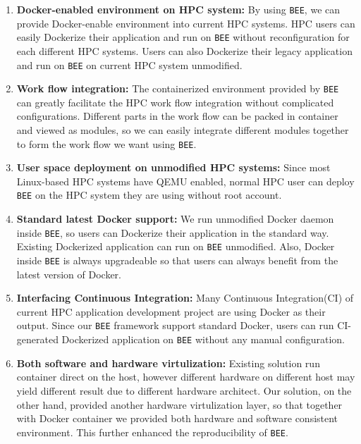 \begin{enumerate}
\item \textbf{Docker-enabled environment on HPC system:}
By using \texttt{BEE}, we can provide Docker-enable environment into current HPC systems. HPC users can easily Dockerize their application and run on \texttt{BEE} without reconfiguration for each different HPC systems. Users can also Dockerize their legacy application and run on \texttt{BEE} on current HPC system unmodified.

\item \textbf{Work flow integration:}
The containerized environment provided by \texttt{BEE} can greatly facilitate the HPC work flow integration without complicated configurations. Different parts in the work flow can be packed in container and viewed as modules, so we can easily integrate different modules together to form the work flow we want using \texttt{BEE}.

\item \textbf{User space deployment on unmodified HPC systems:}
Since most Linux-based HPC systems have QEMU enabled, normal HPC user can deploy \texttt{BEE} on the HPC system they are using without root account.

\item \textbf{Standard latest Docker support:}
We run unmodified Docker daemon inside \texttt{BEE}, so users can Dockerize their application in the standard way. Existing Dockerized application can run on \texttt{BEE} unmodified. Also, Docker inside \texttt{BEE} is always upgradeable so that users can always benefit from the latest version of Docker.

\item \textbf{Interfacing Continuous Integration:}
Many Continuous Integration(CI) of current HPC application development project are using Docker as their output. Since our \texttt{BEE} framework support standard Docker, users can run CI-generated Dockerized application on \texttt{BEE} without any manual configuration.

\item \textbf{Both software and hardware virtulization:}
Existing solution run container direct on the host, however different hardware on different host may yield different result due to different hardware architect. Our solution, on the other hand, provided another hardware virtulization layer, so that together with Docker container we provided both hardware and software consistent environment. This further enhanced the reproducibility of \texttt{BEE}.



\end{enumerate}
